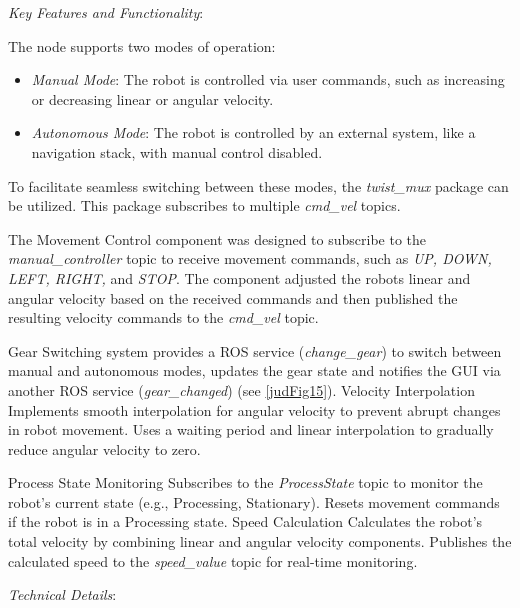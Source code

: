 \documentclass[a4paper,12pt]{extreport}
\begin{document}
\emph{Key Features and Functionality}:

The node supports two modes of operation:

\begin{itemize}
\item
  \emph{Manual Mode}: The robot is controlled via user commands, such as
  increasing or decreasing linear or angular velocity.
\item
  \emph{Autonomous Mode}: The robot is controlled by an external system,
  like a navigation stack, with manual control disabled.
\end{itemize}

To facilitate seamless switching between these modes, the
\emph{twist\_mux} package can be utilized. This package subscribes to
multiple \emph{cmd\_vel} topics.

The Movement Control component was designed to subscribe to the
\emph{manual\_controller} topic to receive movement commands, such as
\emph{UP, DOWN, LEFT, RIGHT,} and \emph{STOP}. The component adjusted
the robot\textquotesingle s linear and angular velocity based on the
received commands and then published the resulting velocity commands to
the \emph{cmd\_vel} topic.

Gear Switching system provides a ROS service (\emph{change\_gear}) to
switch between manual and autonomous modes, updates the gear state and
notifies the GUI via another ROS service (\emph{gear\_changed}) (see
\cref{judFig15}). Velocity Interpolation Implements smooth interpolation for
angular velocity to prevent abrupt changes in robot movement. Uses a
waiting period and linear interpolation to gradually reduce angular
velocity to zero.

Process State Monitoring Subscribes to the \emph{ProcessState} topic to
monitor the robot's current state (e.g., Processing, Stationary). Resets
movement commands if the robot is in a Processing state. Speed
Calculation Calculates the robot's total velocity by combining linear
and angular velocity components. Publishes the calculated speed to the
\emph{speed\_value} topic for real-time monitoring.

\emph{Technical Details}:
\end{document}

